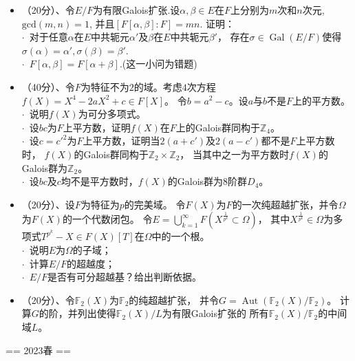 \begin{itemize}
\item[一]（20分）、令$E/F$为有限Galois扩张.设$α,β∈E$在$F$上分别为$m$次和$n$次元, $\mathrm{gcd}(m,n)=1$, 
并且$[F[α,β]:F]=mn$. 证明：\\
$\cdot$\ 对于任意$α$在$E$中共轭元$α'$及$β$在$E$中共轭元$β'$，
存在$σ∈\operatorname{Gal}(E/F)$使得$σ(α)=α',σ(β)=β'$.\\
$\cdot$\ $F[α,β]=F[α+β]$.(这一小问为错题)
\item[二]（40分）、令$F$为特征不为$2$的域。考虑$4$次方程$f(X)=X^4-2aX^2+c∈F[X]$。
令$b=a^2-c$。设$a$与$b$不是$F$上的平方数。\\
$\cdot$\ 说明$f(X)$为可分多项式。\\
$\cdot$\ 设$bc$为$F$上平方数，证明$f(X)$在$F$上的Galois群同构于$\mathbb{Z}_4$。\\
$\cdot$\ 设$c=c'^2$为$F$上平方数，证明当$2(a+c')$及$2(a-c')$都不是$F$上平方数时，
$f(X)$的Galois群同构于$\mathbb{Z}_2×\mathbb{Z}_2$，
当其中之一为平方数时$f(X)$的Galois群为$\mathbb{Z}_2$。\\
$\cdot$\ 设$bc$及$c$均不是平方数时，$f(X)$的Galois群为$8$阶群$D_4$。
\item[三]（20分）、设$F$为特征为$p$的完美域。
令$F(X)$为$F$的一次纯超越扩张，并令$Ω$为$F(X)$的一个代数闭包。
令$E=\bigcup\limits_{k=1}^\infty F(X^\frac{1}{p^k}⊂Ω)$，
其中$X^\frac{1}{p^k}∈Ω$为多项式$T^{p^k}-X∈F(X)[T]$在$Ω$中的一个根。\\
$\cdot$\ 说明$E$为$Ω$的子域；\\
$\cdot$\ 计算$E/F$的超越度；\\
$\cdot$\ $E/F$是否有可分超越基？给出判断依据。
\item[四]（20分）、令$\mathbb{F}_2(X)$为$\mathbb{F}_2$的纯超越扩张，
并令$G=\operatorname{Aut}(\mathbb{F}_2(X)/\mathbb{F}_2)$。
计算$G$的阶，并列出使得$\mathbb{F}_2(X)/L$为有限Galois扩张的
所有$\mathbb{F}_2(X)/\mathbb{F}_2$的中间域$L$。
\end{itemize}

== 2023春 ==

